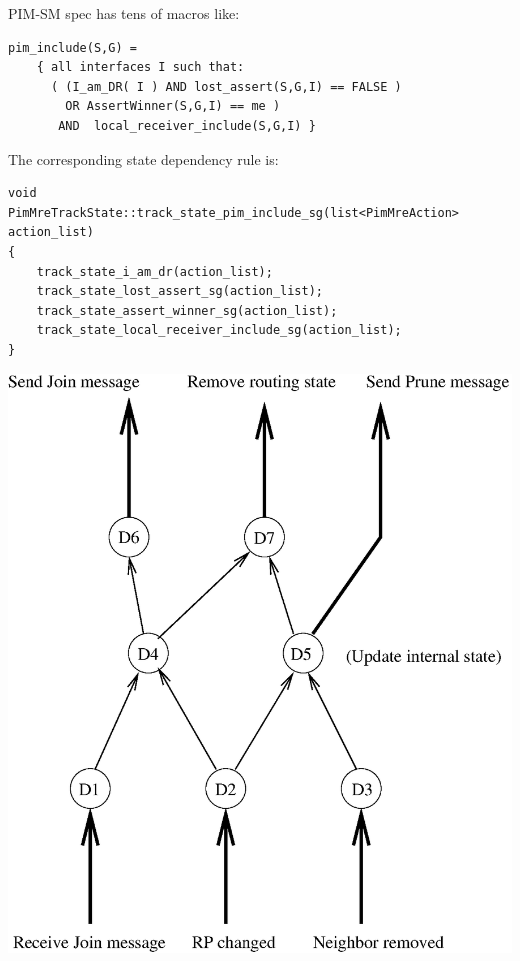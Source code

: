 \documentclass[landscape]{icsislides}
\begin{document}
\begin{slide}

PIM-SM spec has tens of macros like:

\begin{small}
\begin{verbatim}
pim_include(S,G) =
    { all interfaces I such that:
      ( (I_am_DR( I ) AND lost_assert(S,G,I) == FALSE )
        OR AssertWinner(S,G,I) == me )
       AND  local_receiver_include(S,G,I) }
\end{verbatim}
\end{small}

The corresponding state dependency rule is:
\begin{small}
\begin{verbatim}
void
PimMreTrackState::track_state_pim_include_sg(list<PimMreAction> action_list)
{
    track_state_i_am_dr(action_list);
    track_state_lost_assert_sg(action_list);
    track_state_assert_winner_sg(action_list);
    track_state_local_receiver_include_sg(action_list);
}
\end{verbatim}
\end{small}

\end{slide}

\begin{slide}

\begin{center}
  \includegraphics[scale=0.6]{figs/pim_state_dependency}
\end{center}

\end{slide}
\end{document}
